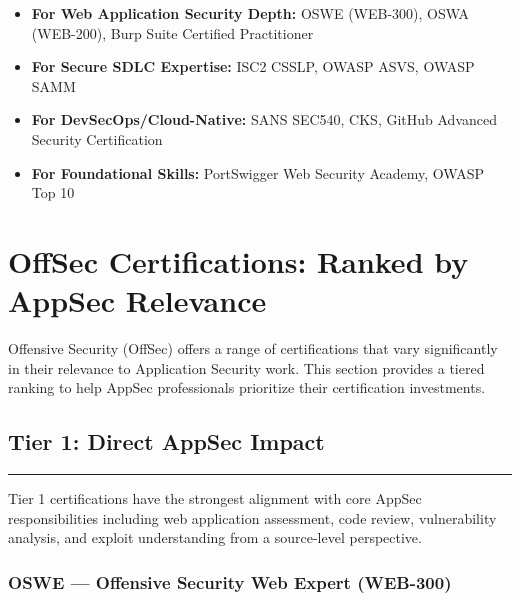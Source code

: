 \documentclass[11pt,letterpaper]{article}
\begin{document}
\begin{itemize}[leftmargin=*]
    \item \textbf{For Web Application Security Depth:} OSWE (WEB-300), OSWA (WEB-200), Burp Suite Certified Practitioner
    \item \textbf{For Secure SDLC Expertise:} ISC2 CSSLP, OWASP ASVS, OWASP SAMM
    \item \textbf{For DevSecOps/Cloud-Native:} SANS SEC540, CKS, GitHub Advanced Security Certification
    \item \textbf{For Foundational Skills:} PortSwigger Web Security Academy, OWASP Top 10
\end{itemize}

\newpage

\section{OffSec Certifications: Ranked by AppSec Relevance}

Offensive Security (OffSec) offers a range of certifications that vary significantly in their relevance to Application Security work. This section provides a tiered ranking to help AppSec professionals prioritize their certification investments.

\subsection{Tier 1: Direct AppSec Impact}

\textcolor{tier1color}{\rule{\linewidth}{2pt}}

Tier 1 certifications have the strongest alignment with core AppSec responsibilities including web application assessment, code review, vulnerability analysis, and exploit understanding from a source-level perspective.

\subsubsection{OSWE --- Offensive Security Web Expert (WEB-300)}
\end{document}
